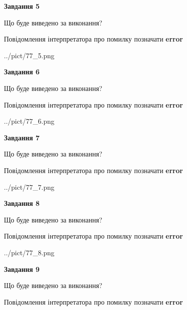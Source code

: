 \documentclass[11pt, ukrainian]{article}
\begin{document}
{\begin {large}
{\begin {center}\textbf{Завдання 5}\end {center}}\par
Що буде виведено за виконання? \par
Повідомлення інтерпретатора про помилку позначати \textbf{error}

\begin{center}
	{../pict/77_5.png}
\end{center}
\newpage

{\begin {center}\textbf{Завдання 6}\end {center}}\par
Що буде виведено за виконання? \par
Повідомлення інтерпретатора про помилку позначати \textbf{error}

\begin{center}
	{../pict/77_6.png}
\end{center}
\newpage

{\begin {center}\textbf{Завдання 7}\end {center}}\par
Що буде виведено за виконання? \par
Повідомлення інтерпретатора про помилку позначати \textbf{error}

\begin{center}
	{../pict/77_7.png}
\end{center}
\newpage

{\begin {center}\textbf{Завдання 8}\end {center}}\par
Що буде виведено за виконання? \par
Повідомлення інтерпретатора про помилку позначати \textbf{error}

\begin{center}
	{../pict/77_8.png}
\end{center}
\newpage

{\begin {center}\textbf{Завдання 9}\end {center}}\par
Що буде виведено за виконання? \par
Повідомлення інтерпретатора про помилку позначати \textbf{error}


\end{large}}
\end{document}
